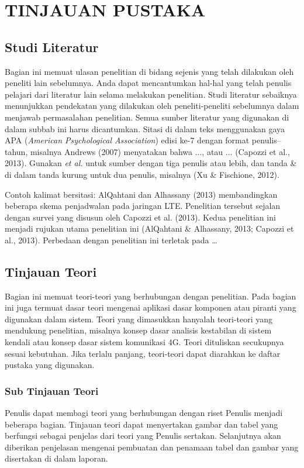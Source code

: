 \chapter{TINJAUAN PUSTAKA}

\section{Studi Literatur}
Bagian ini memuat ulasan penelitian di bidang sejenis yang telah dilakukan oleh peneliti lain sebelumnya. Anda dapat mencantumkan hal-hal yang telah penulis pelajari dari literatur lain selama melakukan penelitian. Studi literatur sebaiknya menunjukkan pendekatan yang dilakukan oleh peneliti-peneliti sebelumnya dalam menjawab permasalahan penelitian. Semua sumber literatur yang digunakan di dalam subbab ini harus dicantumkan. Sitasi di dalam teks menggunakan gaya APA (\textit{American Psychological Association}) edisi ke-7 dengan format penulis--tahun, misalnya Andrews (2007) menyatakan bahwa ..., atau ... (Capozzi et al., 2013). Gunakan \textit{et al.} untuk sumber dengan tiga penulis atau lebih, dan tanda \& di dalam tanda kurung untuk dua penulis, misalnya (Xu \& Fischione, 2012).

Contoh kalimat bersitasi: AlQahtani dan Alhassany (2013) membandingkan beberapa skema penjadwalan pada jaringan LTE. Penelitian tersebut sejalan dengan survei yang disusun oleh Capozzi et al. (2013). Kedua penelitian ini menjadi rujukan utama penelitian ini (AlQahtani \& Alhassany, 2013; Capozzi et al., 2013). Perbedaan dengan penelitian ini terletak pada …

\section{Tinjauan Teori}
Bagian ini memuat teori-teori yang berhubungan dengan penelitian. Pada bagian ini juga termuat dasar teori mengenai aplikasi dasar komponen atau piranti yang digunakan dalam sistem. Teori yang dimasukkan hanyalah teori-teori yang mendukung penelitian, misalnya konsep dasar analisis kestabilan di sistem kendali atau konsep dasar sistem komunikasi 4G. Teori dituliskan secukupnya sesuai kebutuhan. Jika terlalu panjang, teori-teori dapat diarahkan ke daftar pustaka yang digunakan.

\subsection{Sub Tinjauan Teori}
Penulis dapat membagi teori yang berhubungan dengan riset Penulis menjadi beberapa bagian. Tinjauan teori dapat menyertakan gambar dan tabel yang berfungsi sebagai penjelas dari teori yang Penulis sertakan. Selanjutnya akan diberikan penjelasan mengenai pembuatan dan penamaan tabel dan gambar yang disertakan di dalam laporan.

